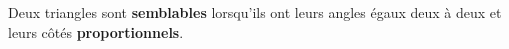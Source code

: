 



\begin{definition} Deux triangles sont \textbf{semblables}   lorsqu'ils ont leurs angles égaux deux à deux et leurs côtés \textbf{proportionnels}. 
\end{definition}

